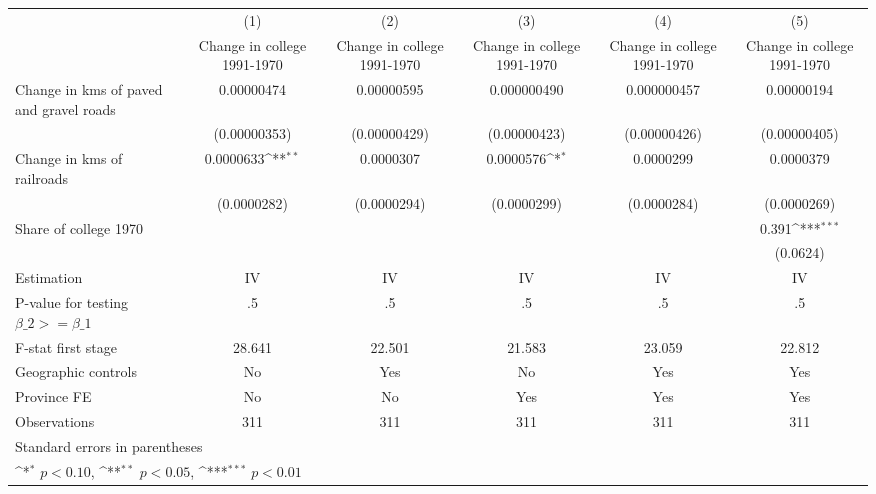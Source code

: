 {
\def\sym#1{\ifmmode^{#1}\else\(^{#1}\)\fi}
\begin{tabular}{l*{5}{c}}
\hline\hline
                    &\multicolumn{1}{c}{(1)}&\multicolumn{1}{c}{(2)}&\multicolumn{1}{c}{(3)}&\multicolumn{1}{c}{(4)}&\multicolumn{1}{c}{(5)}\\
                    &\multicolumn{1}{c}{Change in college 1991-1970}&\multicolumn{1}{c}{Change in college 1991-1970}&\multicolumn{1}{c}{Change in college 1991-1970}&\multicolumn{1}{c}{Change in college 1991-1970}&\multicolumn{1}{c}{Change in college 1991-1970}\\
\hline
Change in kms of paved and gravel roads&  0.00000474         &  0.00000595         & 0.000000490         & 0.000000457         &  0.00000194         \\
                    &(0.00000353)         &(0.00000429)         &(0.00000423)         &(0.00000426)         &(0.00000405)         \\
[1em]
Change in kms of railroads&   0.0000633\sym{**} &   0.0000307         &   0.0000576\sym{*}  &   0.0000299         &   0.0000379         \\
                    & (0.0000282)         & (0.0000294)         & (0.0000299)         & (0.0000284)         & (0.0000269)         \\
[1em]
Share of college 1970&                     &                     &                     &                     &       0.391\sym{***}\\
                    &                     &                     &                     &                     &    (0.0624)         \\
\hline
Estimation          &          IV         &          IV         &          IV         &          IV         &          IV         \\
P-value for testing $\beta\_2 >= \beta\_1$&          .5         &          .5         &          .5         &          .5         &          .5         \\
F-stat first stage  &      28.641         &      22.501         &      21.583         &      23.059         &      22.812         \\
Geographic controls &          No         &         Yes         &          No         &         Yes         &         Yes         \\
Province FE         &          No         &          No         &         Yes         &         Yes         &         Yes         \\
Observations        &         311         &         311         &         311         &         311         &         311         \\
\hline\hline
\multicolumn{6}{l}{\footnotesize Standard errors in parentheses}\\
\multicolumn{6}{l}{\footnotesize \sym{*} \(p<0.10\), \sym{**} \(p<0.05\), \sym{***} \(p<0.01\)}\\
\end{tabular}
}
